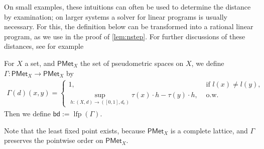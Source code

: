 \documentclass[a4paper,UKenglish,cleveref,autoref,thm-restate]{lipics-v2021}
\newcommand{\bd}{\mathsf{bd}}
\newcommand\PMet{\mathsf{PMet}}
\DeclareMathOperator{\lfp}{lfp}
\begin{document}
On small examples, these intuitions can often be used to determine the distance by examination; on larger systems a solver for linear programs is usually necessary.
For this, the definition below can be transformed into a rational linear program, as we use in the proof of \cref{lem:nstep}.
For further discussions of these distances, see for example~\cite{DBLP:journals/siglog/Breugel17, DBLP:conf/fossacs/RadyB23} %
\begin{definition}
	For \(X\) a set, and \(\PMet_X\) the set of pseudometric spaces on \(X\), we define \(\Gamma \colon \PMet_X \to \PMet_X\) by
	\begin{align*}
		\Gamma(d)(x,y) = \begin{cases}
			                 1,                                                                           & \text{ if } l(x) \neq l(y), \\
			                 \sup_{h \colon (X,d) \to ([0,1],d_e)} \tau(x) \cdot h - \tau(y) \cdot h, & \text{ o.w.}
		                 \end{cases}
	\end{align*}
	Then we define \(\bd := \lfp(\Gamma)\).
\end{definition}
Note that the least fixed point exists, because \(\PMet_X\) is a complete lattice, and \(\Gamma\) preserves the pointwise order on \(\PMet_X\).
\end{document}
